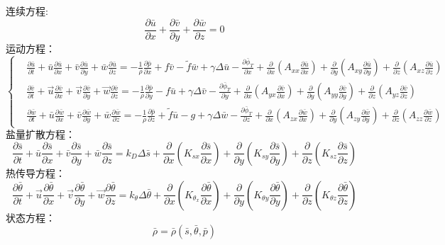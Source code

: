 \documentclass[a4paper,12pt]{article}
\begin{document}
    \begin{framed}
    连续方程:
    \[
        \frac{\partial \bar{u}}{\partial x}+\frac{\partial \bar{v}}{\partial y}+\frac{\partial \bar{w}}{\partial z}=0
    \]
    运动方程：
    \[
        \left\{
        \begin{aligned}
            &\frac{\partial \bar{u}}{\partial t}+\bar{u} \frac{\partial \bar{u}}{\partial x}+\bar{v} \frac{\partial \bar{u}}{\partial y}+\bar{w} \frac{\partial \bar{u}}{\partial z}=-\frac{1}{\rho} \frac{\partial \bar{p}}{\partial x}+f \bar{v}-\tilde{f} \bar{w}+\gamma \Delta \bar{u}-\frac{\partial \bar{\phi}_{T}}{\partial x}+\frac{\partial}{\partial x}\left(A_{x x} \frac{\partial \bar{u}}{\partial x}\right)+\frac{\partial}{\partial y}\left(A_{x y} \frac{\partial \bar{u}}{\partial y}\right)+\frac{\partial}{\partial z}\left(A_{x z} \frac{\partial \bar{u}}{\partial z}\right)\\
            &\frac{\partial \bar{v}}{\partial t}+\vec{u} \frac{\partial \bar{v}}{\partial x}+\vec{v} \frac{\partial \bar{v}}{\partial y}+\vec{w} \frac{\partial \bar{v}}{\partial z}=-\frac{1}{\rho} \frac{\partial \bar{p}}{\partial y}-f \bar{u}+\gamma \Delta \bar{v}-\frac{\partial \bar{\phi}_{T}}{\partial y}+\frac{\partial}{\partial x}\left(A_{y x} \frac{\partial \bar{v}}{\partial x}\right)+\frac{\partial}{\partial y}\left(A_{y y} \frac{\partial \bar{v}}{\partial y}\right)+\frac{\partial}{\partial z}\left(A_{y z} \frac{\partial \bar{v}}{\partial z}\right)\\
            &\frac{\partial \bar{w}}{\partial t}+\bar{u} \frac{\partial \bar{w}}{\partial x}+\bar{v} \frac{\partial \bar{w}}{\partial y}+\bar{w} \frac{\partial \bar{w}}{\partial z}=-\frac{1}{\rho} \frac{\partial \bar{p}}{\partial z}+\tilde{f} \bar{u}-g+\gamma \Delta \bar{w}-\frac{\partial \bar{\phi}_{T}}{\partial z}+\frac{\partial}{\partial x}\left(A_{z x} \frac{\partial \bar{w}}{\partial x}\right)+\frac{\partial}{\partial y}\left(A_{z y} \frac{\partial \bar{w}}{\partial y}\right)+\frac{\partial}{\partial z}\left(A_{z z} \frac{\partial \bar{w}}{\partial z}\right)
        \end{aligned}
        \right.
    \]
    盐量扩散方程：
    \[
        \frac{\partial \bar{s}}{\partial t}+\bar{u} \frac{\partial \bar{s}}{\partial x}+\bar{v} \frac{\partial \bar{s}}{\partial y}+\bar{w} \frac{\partial \bar{s}}{\partial z}=k_{D} \Delta \bar{s}+\frac{\partial}{\partial x}\left(K_{s x} \frac{\partial \bar{s}}{\partial x}\right)+\frac{\partial}{\partial y}\left(K_{s y} \frac{\partial \bar{s}}{\partial y}\right)+\frac{\partial}{\partial z}\left(K_{s z} \frac{\partial \bar{s}}{\partial z}\right)
    \]
    热传导方程：
    \[
        \frac{\partial \bar{\theta}}{\partial t}+\vec{u} \frac{\partial \bar{\theta}}{\partial x}+\vec{v} \frac{\partial \bar{\theta}}{\partial y}+\vec{w} \frac{\partial \bar{\theta}}{\partial z}=k_{\theta} \Delta \bar{\theta}+\frac{\partial}{\partial x}\left(K_{\theta_{x}} \frac{\partial \bar{\theta}}{\partial x}\right)+\frac{\partial}{\partial y}\left(K_{\theta y} \frac{\partial \bar{\theta}}{\partial y}\right)+\frac{\partial}{\partial z}\left(K_{\theta z} \frac{\partial \bar{\theta}}{\partial z}\right)
    \]
    状态方程：
    \[
        \bar{\rho}=\bar{\rho}(\bar{s}, \bar{\theta}, \bar{p})
    \]
    \end{framed}
\end{document}
